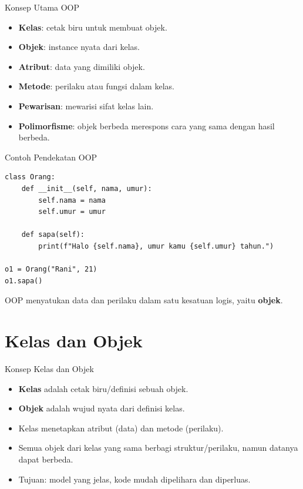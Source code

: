 \documentclass[aspectratio=169, table]{beamer}
\begin{document}
\begin{frame}[fragile]{Konsep Utama OOP}
\vspace{20pt}
\begin{itemize}
    \item \textbf{Kelas}: cetak biru untuk membuat objek.  
    \item \textbf{Objek}: instance nyata dari kelas.  
    \item \textbf{Atribut}: data yang dimiliki objek.  
    \item \textbf{Metode}: perilaku atau fungsi dalam kelas.  
    \item \textbf{Pewarisan}: mewarisi sifat kelas lain.  
    \item \textbf{Polimorfisme}: objek berbeda merespons cara yang sama dengan hasil berbeda.
\end{itemize}
\end{frame}

\begin{frame}[fragile]{Contoh Pendekatan OOP}
\vspace{20pt}
\begin{lstlisting}[style=PythonStyle]
class Orang:
    def __init__(self, nama, umur):
        self.nama = nama
        self.umur = umur

    def sapa(self):
        print(f"Halo {self.nama}, umur kamu {self.umur} tahun.")

o1 = Orang("Rani", 21)
o1.sapa()
\end{lstlisting}
OOP menyatukan data dan perilaku dalam satu kesatuan logis, yaitu \textbf{objek}.
\end{frame}

\section{Kelas dan Objek}

\begin{frame}[fragile]{Konsep Kelas dan Objek}
\vspace{20pt}
\begin{itemize}
    \item \textbf{Kelas} adalah cetak biru/definisi sebuah objek.
    \item \textbf{Objek} adalah wujud nyata dari definisi kelas.
    \item Kelas menetapkan atribut (data) dan metode (perilaku).
    \item Semua objek dari kelas yang sama berbagi struktur/perilaku, namun datanya dapat berbeda.
    \item Tujuan: model yang jelas, kode mudah dipelihara dan diperluas.
\end{itemize}
\end{frame}
\end{document}
